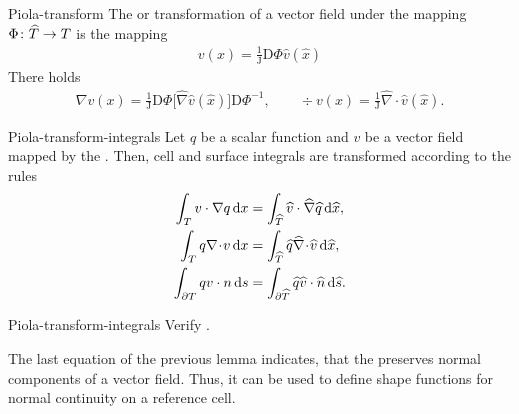 \begin{Definition}{Piola-transform}
  The  or 
    transformation of a vector field under the mapping
  $\Phi\colon\widehat {T}\to T$ is the mapping
  \begin{gather}
    v(x) = \tfrac1{\mathrm J} \mathrm D\Phi \widehat v(\widehat x)
  \end{gather}
  There holds
  \begin{gather}
    \nabla v(x) = \tfrac1{\mathrm J} \mathrm D\Phi
    \bigl[\widehat\nabla \widehat v(\widehat x)\bigr] \mathrm D\Phi^{-1},
    \qquad
    \div v(x) = \tfrac1{\mathrm J} \widehat\nabla\!\cdot\!
    \widehat v(\widehat x).
  \end{gather}
\end{Definition}

\begin{Lemma}{Piola-transform-integrals}
  Let $q$ be a scalar function and $v$ be a 
  vector field mapped by the . Then, cell
  and surface integrals are transformed according to the rules
  \begin{gather}
    \begin{split}
      \int_{T} v \cdot \nabla q \,\mathrm{d} x
      &= \int_{\widehat {T}} \widehat v \cdot \widehat \nabla \widehat q \,\mathrm{d} \widehat x,
      \\
      \int_{T} q \nabla\!\cdot\! v \,\mathrm{d} x
      &= \int_{\widehat {T}} \widehat q \widehat \nabla\!\cdot\! \widehat v \,\mathrm{d} \widehat x,
      \\
      \int_{\partial T} q v\cdot n \,\mathrm{d} s
      &= \int_{\partial\widehat {T}} \widehat q \widehat v\cdot\widehat {n} \,\mathrm{d} \widehat s.
    \end{split}
  \end{gather}
\end{Lemma}

\begin{Problem}{Piola-transform-integrals}
  Verify .
\end{Problem}

\begin{remark}
  The last equation of the previous lemma indicates, that the
   preserves normal components of a vector
  field. Thus, it can be used to define shape functions for normal
  continuity on a reference cell.
\end{remark}

